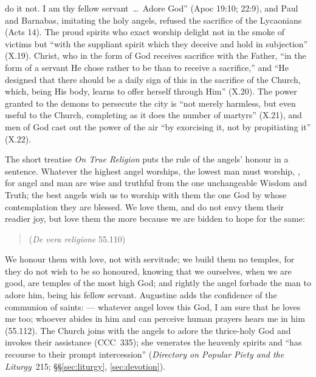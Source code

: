 do it not. I am thy fellow servant~\dots\ Adore God'' (Apoc 19:10;
22:9), and Paul and Barnabas, imitating the holy angels, refused the
sacrifice of the Lycaonians (Acts 14). The proud
spirits who exact worship delight not in the smoke of victims but ``with
the suppliant spirit which they deceive and hold in subjection'' (X.19).
Christ, who in the form of God receives sacrifice with the Father, ``in
the form of a servant He chose rather to be than to receive a sacrifice,''
and ``He designed that there should be a daily sign of this in the
sacrifice of the Church, which, being His body, learns to offer herself
through Him'' (X.20). The power granted to the demons to persecute the
city is ``not merely harmless, but even useful to the Church, completing
as it does the number of martyrs'' (X.21), and men of God cast out the
power of the air ``by exorcising it, not by propitiating it'' (X.22).

The short treatise \emph{On True Religion} puts the rule of the angels'
honour in a sentence. Whatever the highest angel worships, the lowest man
must worship, , for angel and man are wise and truthful from the
one unchangeable Wisdom and Truth; the best angels wish us to worship
with them the one God by whose contemplation they are blessed. We love
them, and do not envy them their readier joy, but love them the more
because we are bidden to hope for the same:
\begin{quote}
 (\emph{De vera religione} 55.110)
\end{quote}
We honour them with love, not with servitude; we build them no temples,
for they do not wish to be so honoured, knowing that we ourselves, when we
are good, are temples of the most high God; and rightly the angel forbade
the man to adore him, being his fellow servant. Augustine adds the
confidence of the communion of saints:  --- whatever angel
loves this God, I am sure that he loves me too; whoever abides in him and
can perceive human prayers hears me in him (55.112). The Church joins
with the angels to adore the thrice-holy God and invokes their assistance
(CCC~335); she venerates the heavenly spirits and ``has recourse to their
prompt intercession'' (\emph{Directory on Popular Piety and the Liturgy}~215;
\S\S\ref{sec:liturgy}, \ref{sec:devotion}).

